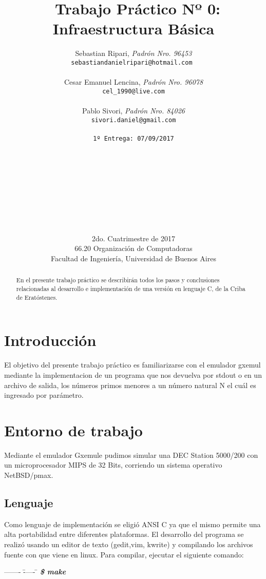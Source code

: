 \documentclass[a4paper,10pt]{article}
\title{	\ Trabajo Práctico Nº 0: Infraestructura Básica}
\author{	Sebastian Ripari, \textit{Padrón Nro. 96453}\\
            \texttt{sebastiandanielripari@hotmail.com }\\\\
            Cesar Emanuel Lencina, \textit{Padrón Nro. 96078}\\
            \texttt{cel_1990@live.com}\\\\
			Pablo Sivori, \textit{Padrón Nro. 84026}\\
            \texttt{sivori.daniel@gmail.com}\\\\               
            \texttt{\footnotesize 1º Entrega: 07/09/2017}\\
            \\\\\\\\\\\\\\\\\\
            \normalsize{2do. Cuatrimestre de 2017}\\ 
            \normalsize{66.20 Organización de Computadoras} \\
            \normalsize{Facultad de Ingeniería, Universidad de Buenos Aires} \\}
\date{}
\begin{document}
\maketitle
\thispagestyle{empty}
\begin{abstract}
En el presente trabajo práctico se describirán todos los pasos y 
conclusiones relacionadas al desarrollo e implementación de una versión en lenguaje C,
de la Criba de Eratóstenes.
\end{abstract}
\newpage{}
\tableofcontents
\newpage{}

\begin{flushleft}

\par\end{flushleft}
\section{{\normalsize Introducción}}

El objetivo del presente trabajo práctico es familiarizarse con el emulador gxemul mediante la implementacion de un programa que nos devuelva por stdout o en un archivo de salida, los números primos menores a un número natural N el cuál es ingresado por parámetro.

\section{{\normalsize Entorno de trabajo}}
Mediante el emulador Gxemule pudimos simular una DEC Station 5000/200 con un microprocesador MIPS de 32 Bits, corriendo un sistema 
operativo NetBSD/pmax.

\subsection{{\normalsize Lenguaje}}

Como lenguaje de implementación se eligió ANSI C
ya que el mismo permite una alta portabilidad entre diferentes plataformas. 
El desarrollo del programa se realizó usando un editor de texto 
(gedit,vim, kwrite) y compilando los archivos fuente con 
 que viene en linux.
Para compilar, ejecutar el siguiente comando:

\begin{tabbing}
------- \= ----- \= \kill
\> \textbf{\emph{\$ make}}\\ 
\end{tabbing}
\end{document}
